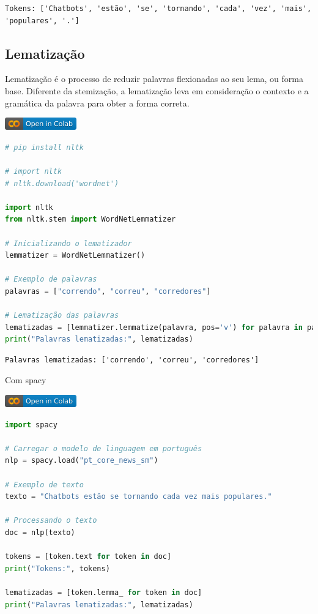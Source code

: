 \documentclass[14pt,a4paper,oneside]{book}
\begin{document}
\begin{lstlisting}
Tokens: ['Chatbots', 'estão', 'se', 'tornando', 'cada', 'vez', 'mais', 'populares', '.']
\end{lstlisting}


\subsection{Lematização}

Lematização é o processo de reduzir palavras flexionadas ao seu lema, ou forma base. Diferente da stemização, a lematização leva em consideração o contexto e a gramática da palavra para obter a forma correta.

\vspace{\baselineskip}
\href{https://colab.research.google.com/github/giseldo/chatbotbook/blob/main/notebook/pln/pln1_2.ipynb}{
  \includegraphics{./fig/colab-badge.png}
}

\begin{lstlisting}[language=Python]
# pip install nltk

# import nltk
# nltk.download('wordnet')

import nltk
from nltk.stem import WordNetLemmatizer

# Inicializando o lematizador
lemmatizer = WordNetLemmatizer()

# Exemplo de palavras
palavras = ["correndo", "correu", "corredores"]

# Lematização das palavras
lematizadas = [lemmatizer.lemmatize(palavra, pos='v') for palavra in palavras]
print("Palavras lematizadas:", lematizadas)
\end{lstlisting}

\begin{lstlisting}
Palavras lematizadas: ['correndo', 'correu', 'corredores']
\end{lstlisting}

Com spacy

\vspace{\baselineskip}
\href{https://colab.research.google.com/github/giseldo/chatbotbook/blob/main/notebook/pln/pln1_2_2.ipynb}{
  \includegraphics{./fig/colab-badge.png}
}

\begin{lstlisting}[language=Python]
import spacy

# Carregar o modelo de linguagem em português
nlp = spacy.load("pt_core_news_sm")

# Exemplo de texto
texto = "Chatbots estão se tornando cada vez mais populares."

# Processando o texto
doc = nlp(texto)

tokens = [token.text for token in doc]
print("Tokens:", tokens)

lematizadas = [token.lemma_ for token in doc]
print("Palavras lematizadas:", lematizadas)
\end{lstlisting}
\end{document}
